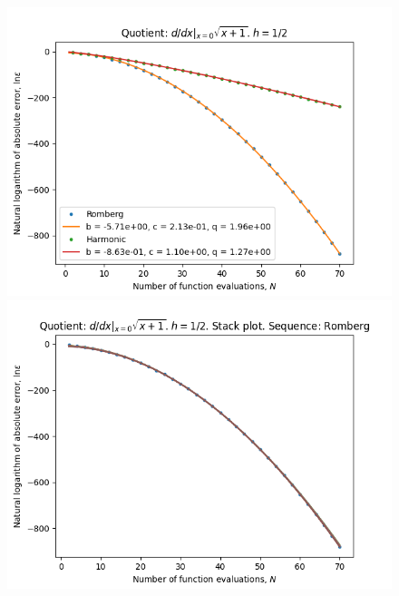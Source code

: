 \begin{figure}[H]
\centering
\begin{minipage}{0.45\textwidth}
\centering
\includegraphics[scale=0.45]{../results/diff_quot_plots/sqrt_1_hp_trend.png}
\end{minipage}
\begin{minipage}{0.45\textwidth}
\centering
\includegraphics[scale=0.45]{../results/diff_quot_plots/sqrt_1_hp_romberg_stack.png}
\end{minipage}
\end{figure}

